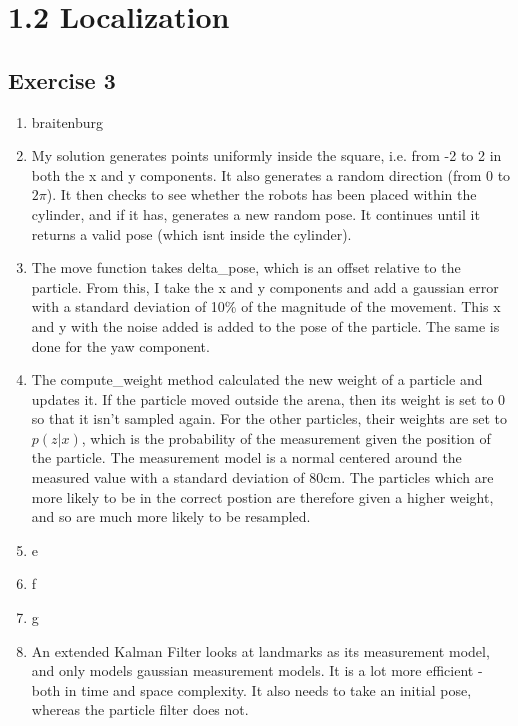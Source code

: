 \documentclass[12pt,a4paper]{article}
\begin{document}
\section*{1.2 Localization}
\subsection*{Exercise 3}
\begin{enumerate}[label=(\alph*)]
	\item braitenburg
	\item My solution generates points uniformly inside the square, i.e. from -2 to 2 in both the x and y components. It also generates a random direction (from 0 to $2\pi$). It then checks to see whether the robots has been placed within the cylinder, and if it has, generates a new random pose. It continues until it returns a valid pose (which isnt inside the cylinder).
	\item The move function takes delta\_pose, which is an offset relative to the particle. From this, I take the x and y components and add a gaussian error with a standard deviation of 10\% of the magnitude of the movement. This x and y with the noise added is added to the pose of the particle. The same is done for the yaw component.
	\item The compute\_weight method calculated the new weight of a particle and updates it. If the particle moved outside the arena, then its weight is set to 0 so that it isn't sampled again. For the other particles, their weights are set to $ p(z|x) $, which is the probability of the measurement given the position of the particle. The measurement model is a normal centered around the measured value with a standard deviation of 80cm. The particles which are more likely to be in the correct postion are therefore given a higher weight, and so are much more likely to be resampled.
	\item e
	\item f
	\item g
	\item An extended Kalman Filter looks at landmarks as its measurement model, and only models gaussian measurement models. It is a lot more efficient - both in time and space complexity. It also needs to take an initial pose, whereas the particle filter does not.
\end{enumerate}
\end{document}

